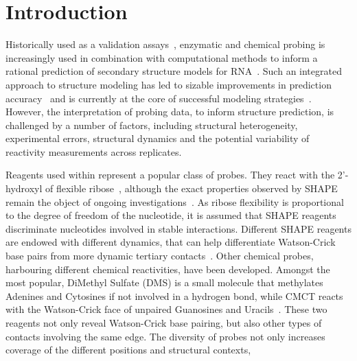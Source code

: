 \documentclass[a4,center,fleqn]{NAR}
\begin{document}


\section*{Introduction}


Historically used as a validation assays~\cite{Knapp1989}, enzymatic and chemical probing  is increasingly used in combination with computational methods to inform a rational prediction of secondary structure models for RNA~\cite{Mathews2004}. Such an integrated approach to structure modeling has led to sizable improvements in prediction accuracy~\cite{Washietl2012} and is currently at the core of successful modeling strategies~\cite{Miao2017}. However, the interpretation of probing data, to inform structure prediction, is challenged by a number of factors, including structural heterogeneity, experimental errors, structural dynamics and the potential variability of reactivity measurements across replicates. 

Reagents used within  represent a popular class of probes. They react with the 2’-hydroxyl of flexible ribose~\cite{McGinnis2012}, although the exact properties observed by SHAPE remain the object of ongoing investigations~\cite{McGinnis2012,Sexton2017,Hurst2018,Mlynsky2018,Frezza2019,Busan2019}.
As ribose flexibility is proportional to the degree of freedom of the nucleotide, it is assumed that SHAPE reagents discriminate nucleotides involved in stable interactions. Different SHAPE reagents are endowed with different dynamics, that can help differentiate Watson-Crick base pairs from more dynamic tertiary contacts~\cite{Gherghe2008,Steen2012,Rice2014,Busan2019}. Other chemical probes, harbouring different chemical reactivities, have been developed. Amongst the most popular, DiMethyl Sulfate (DMS) is a small molecule that methylates Adenines and Cytosines if not involved in a hydrogen bond, while   CMCT reacts with the Watson-Crick face of unpaired Guanosines and Uracils~\cite{Ehresmann1987,Brunel2000}. These two reagents not only reveal Watson-Crick base pairing, but also other types of contacts involving the same edge. The diversity of probes not only increases coverage of the different positions and structural contexts, 
\end{document}
